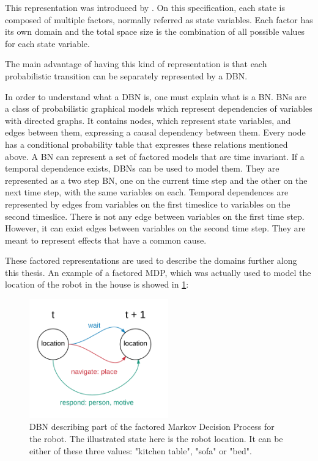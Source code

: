 This representation was introduced by \cite{boutilier1999decision}. On this
specification, each state is composed of multiple factors, normally referred as
state variables. Each factor has its own domain and the total space size is the
combination of all possible values for each state variable.

The main advantage of having this kind of representation is that each
probabilistic transition can be separately represented by a \gls{DBN}.

In order to understand what a \gls{DBN} is, one must explain what is a \gls{BN}.
\glspl{BN} are a class of probabilistic graphical models which represent
dependencies of variables with directed graphs. It contains nodes, which
represent state variables, and edges between them, expressing a causal
dependency between them.
Every node has a conditional probability table that expresses these relations
mentioned above. A \gls{BN} can represent a set of factored models that are
time invariant. If a temporal dependence exists, \glspl{DBN} can be used to
model them. They are represented as a two step \gls{BN}, one on the current time
step and the other on the next time step, with the same variables on each.
Temporal dependences are represented by edges from variables on the first
timeslice to variables on the second timeslice. There is not any edge between
variables on the first time step. However, it can exist edges between variables
on the second time step. They are meant to represent effects that have a
common cause.

These factored representations are used to describe the domains further along
this thesis. An example of a factored MDP, which was actually used to model the
location of the robot in the house is showed in \ref{fig:fmdp_example}:

\begin{figure}[H]
    \centering
        \includegraphics[width=6cm]{images/fmdp}
        \caption{\gls{DBN} describing part of the factored Markov Decision Process for the
        robot. The illustrated state here is the robot location. It can be
        either of these three values: "kitchen table", "sofa" or "bed".}
        \label{fig:fmdp_example}
\end{figure}

